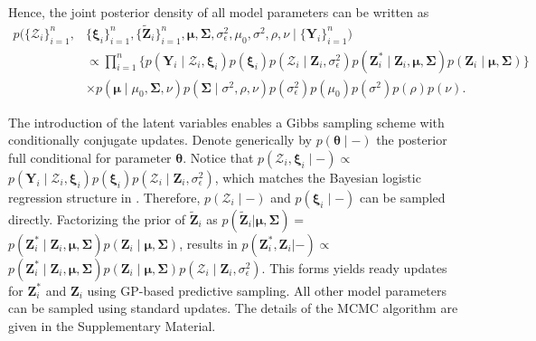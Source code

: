Hence, the joint posterior density of all model parameters can be written as
\begin{equation}
    \begin{split}
        p(\{\boldsymbol{\mathcal{Z}}_i\}_{i=1}^n,&\{\boldsymbol{\xi}_i\}_{i=1}^n,\{\tilde{\mathbf{Z}}_i\}_{i=1}^n,
        \boldsymbol{\mu},\boldsymbol{\Sigma},\sigma_{\epsilon}^2,\mu_0,\sigma^2,\rho,\nu\mid \{\mathbf{Y}_i\}_{i=1}^n)\\
        &\propto \prod_{i=1}^n\{p(\mathbf{Y}_i\mid \boldsymbol{\mathcal{Z}}_i,\boldsymbol{\xi}_i)p(\boldsymbol{\xi}_i)p(\boldsymbol{\mathcal{Z}}_i\mid \mathbf{Z}_i,\sigma_{\epsilon}^2)p(\mathbf{Z}_i^*\mid\mathbf{Z}_i,\boldsymbol{\mu},\boldsymbol{\Sigma})p(\mathbf{Z}_i\mid \boldsymbol{\mu},\boldsymbol{\Sigma})\}\\
        &\times p(\boldsymbol{\mu}\mid \mu_0,\boldsymbol{\Sigma},\nu)p(\boldsymbol{\Sigma}\mid \sigma^2,\rho,\nu)p(\sigma_{\epsilon}^2)p(\mu_0)p(\sigma^2)p(\rho)p(\nu).
    \end{split}
    \label{eq:jointpostmodelbin}
\end{equation}


The introduction of the latent variables enables a Gibbs sampling scheme with conditionally 
conjugate updates. Denote generically by $p(\boldsymbol{\theta}\mid -)$ 
the posterior full conditional for parameter $\boldsymbol{\theta}$. Notice 
that $p(\boldsymbol{\mathcal{Z}}_i,\boldsymbol{\xi}_i\mid -)\propto $
$p(\mathbf{Y}_i \mid \boldsymbol{\mathcal{Z}}_i,\boldsymbol{\xi}_i) p(\boldsymbol{\xi}_i) p(\boldsymbol{\mathcal{Z}}_i\mid \mathbf{Z}_i,\sigma_{\epsilon}^2)$, 
which matches the Bayesian logistic regression structure in \citet{Polson2013}. 
Therefore, $p(\boldsymbol{\mathcal{Z}}_i\mid -)$ and $p(\boldsymbol{\xi}_i\mid -)$ 
can be sampled directly. 
Factorizing the prior of $\tilde{\mathbf{Z}}_i$ as $p(\tilde{\mathbf{Z}}_i|\boldsymbol{\mu},\boldsymbol{\Sigma})=$
$p(\mathbf{Z}_i^*\mid\mathbf{Z}_i,\boldsymbol{\mu},\boldsymbol{\Sigma})p(\mathbf{Z}_i\mid \boldsymbol{\mu},\boldsymbol{\Sigma})$, 
results in $p(\mathbf{Z}_i^*,\mathbf{Z}_i| -)\propto$
$ p(\mathbf{Z}_i^*\mid\mathbf{Z}_i,\boldsymbol{\mu},\boldsymbol{\Sigma})
p(\mathbf{Z}_i\mid \boldsymbol{\mu},\boldsymbol{\Sigma})
p(\boldsymbol{\mathcal{Z}}_i\mid \mathbf{Z}_i,\sigma_{\epsilon}^2)$. This forms yields
ready updates for $\mathbf{Z}_i^*$ and $\mathbf{Z}_i$ using GP-based predictive sampling.
All other model parameters can be sampled using standard updates. The details of the 
MCMC algorithm are given in the Supplementary Material. 


